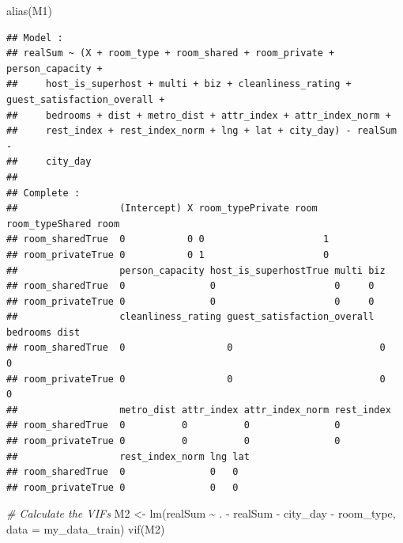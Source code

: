 \documentclass[
]{article}
\newenvironment{Shaded}{\begin{snugshade}}{\end{snugshade}}
\newcommand{\AttributeTok}[1]{\textcolor[rgb]{0.77,0.63,0.00}{#1}}
\newcommand{\CommentTok}[1]{\textcolor[rgb]{0.56,0.35,0.01}{\textit{#1}}}
\newcommand{\FunctionTok}[1]{\textcolor[rgb]{0.00,0.00,0.00}{#1}}
\newcommand{\NormalTok}[1]{#1}
\newcommand{\OtherTok}[1]{\textcolor[rgb]{0.56,0.35,0.01}{#1}}
\newcommand{\SpecialCharTok}[1]{\textcolor[rgb]{0.00,0.00,0.00}{#1}}
\begin{document}
\begin{Shaded}
\begin{Highlighting}[]
\FunctionTok{alias}\NormalTok{(M1)}
\end{Highlighting}
\end{Shaded}

\begin{verbatim}
## Model :
## realSum ~ (X + room_type + room_shared + room_private + person_capacity + 
##     host_is_superhost + multi + biz + cleanliness_rating + guest_satisfaction_overall + 
##     bedrooms + dist + metro_dist + attr_index + attr_index_norm + 
##     rest_index + rest_index_norm + lng + lat + city_day) - realSum - 
##     city_day
## 
## Complete :
##                  (Intercept) X room_typePrivate room room_typeShared room
## room_sharedTrue  0           0 0                     1                   
## room_privateTrue 0           0 1                     0                   
##                  person_capacity host_is_superhostTrue multi biz
## room_sharedTrue  0               0                     0     0  
## room_privateTrue 0               0                     0     0  
##                  cleanliness_rating guest_satisfaction_overall bedrooms dist
## room_sharedTrue  0                  0                          0        0   
## room_privateTrue 0                  0                          0        0   
##                  metro_dist attr_index attr_index_norm rest_index
## room_sharedTrue  0          0          0               0         
## room_privateTrue 0          0          0               0         
##                  rest_index_norm lng lat
## room_sharedTrue  0               0   0  
## room_privateTrue 0               0   0
\end{verbatim}

\begin{Shaded}
\begin{Highlighting}[]
\CommentTok{\# Calculate the VIFs}
\NormalTok{M2 }\OtherTok{\textless{}{-}} \FunctionTok{lm}\NormalTok{(realSum }\SpecialCharTok{\textasciitilde{}}\NormalTok{ . }\SpecialCharTok{{-}}\NormalTok{ realSum }\SpecialCharTok{{-}}\NormalTok{ city\_day }\SpecialCharTok{{-}}\NormalTok{ room\_type, }\AttributeTok{data =}\NormalTok{ my\_data\_train)}
\FunctionTok{vif}\NormalTok{(M2)}
\end{Highlighting}
\end{Shaded}
\end{document}
